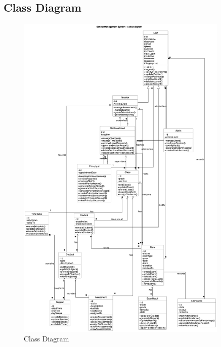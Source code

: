 \documentclass[12pt,a4paper]{report}
\begin{document}
\subsection{Class Diagram}
\begin{figure}[htbp]
    \centering
    \includegraphics[width=0.9\textwidth]{class-diagram.png}
    \caption{Class Diagram}
    \label{fig:class-diagram}
\end{figure}
\end{document}
